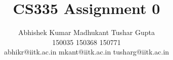 \documentclass[11pt]{article}
\begin{document}
\author{Abhishek Kumar\hspace{0.25cm}
Madhukant\hspace{0.25cm}
Tushar Gupta \\ 150035\hspace{1cm} 150368\hspace{1cm} 150771 \\
abhikr@iitk.ac.in mkant@iitk.ac.in tusharg@iitk.ac.in} 
\title{CS335 Assignment 0}
\maketitle

\end{document}
